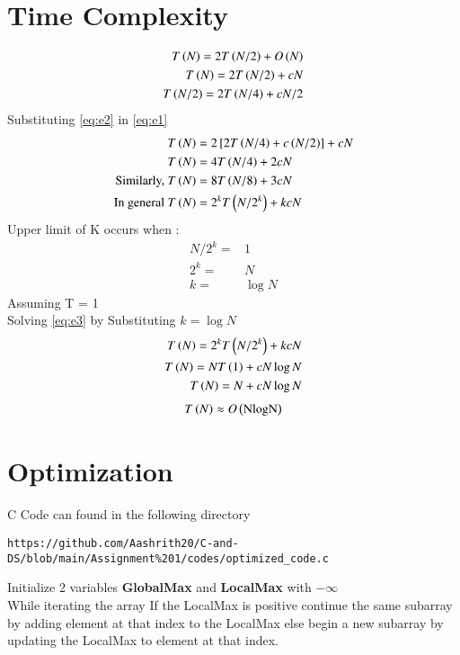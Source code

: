 \documentclass[journal,12pt,twocolumn]{IEEEtran}
\begin{document}
\section{Time Complexity}
\begin{align}
    T\brak{N} = 2T\brak{N/2} + O\brak{N} \\
    \label{eq:e1}
    T\brak{N} = 2T\brak{N/2} + cN \\
    \label{eq:e2}
    T\brak{N/2} = 2T\brak{N/4} + cN/2
\end{align}
Substituting \eqref{eq:e2} in \eqref{eq:e1}
\begin{align}
    T\brak{N} &= 2\sbrak{2T\brak{N/4}+c\brak{N/2}} + cN \\
    T\brak{N} &= 4T\brak{N/4} + 2cN \\
    \text{Similarly, }T\brak{N} &= 8T\brak{N/8} + 3cN \\
    \text{In general }T\brak{N}&=2^k T\brak{N/2^k} + kcN 
    \label{eq:e3}
\end{align}
Upper limit of K occurs when :
\begin{align}
    N/2^k =& 1\\
    2^k =& N \\
    k =& \log{N}
\end{align}
Assuming T = 1 \\
Solving \eqref{eq:e3} by Substituting $k =\log{N}$ \\
\begin{align}
    T\left(N\right)=2^k T\left(N/2^k\right) + kcN\\
    T\left(N\right)=N T\left(1\right) + cN\log{N} \\
    T\left(N\right)=N+cN\log{N}
\end{align}
\begin{align}
    T\left(N\right) \approx O\left(\text{NlogN}\right)
\end{align}


\section{Optimization}
C Code can found in the following directory
\begin{lstlisting}
https://github.com/Aashrith20/C-and-DS/blob/main/Assignment%201/codes/optimized_code.c
\end{lstlisting}

Initialize 2 variables \textbf{GlobalMax} and \textbf{LocalMax} with $-\infty$ \\

While iterating the array If the LocalMax is positive continue the same subarray by adding element at that index to the LocalMax else begin a new subarray by updating the LocalMax to element at that index.\\
\end{document}
